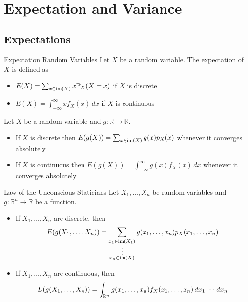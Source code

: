 \documentclass[a4paper]{article}
\begin{document}
\pagebreak
\section{Expectation and Variance}
\subsection{Expectations}
\begin{defn}{Expectation Random Variables}{} Let $X$ be a random variable. The expectation of $X$ is defined as 
\begin{itemize}
\item $E(X)=\sum_{x\in\operatorname{im}(X)}x\mathbb{P}_X(X=x)$ if $X$ is discrete
\item $E(X)=\int_{-\infty}^{\infty}xf_X(x)\,dx$ if $X$ is continuous
\end{itemize}
\end{defn}

\begin{prp}{}{} Let $X$ be a random variable and $g:\mathbb{R}\to\mathbb{R}$. 
\begin{itemize}
\item If $X$ is discrete then $E(g(X))=\sum_{x\in\operatorname{im}(X)}g(x)p_X(x)$ whenever it converges absolutely
\item If $X$ is continuous then $E(g(X))=\int_{-\infty}^{\infty}g(x)f_X(x)\,dx$ whenever it converges absolutely
\end{itemize}
\end{prp}

\begin{prp}{Law of the Unconscious Staticians}{} Let $X_1,\dots,X_n$ be random variables and $g:\mathbb{R}^n\to\mathbb{R}$ be a function. 
\begin{itemize}
\item If $X_1,\dots,X_n$ are discrete, then $$E(g(X_1,\dots,X_n))=\sum_{\substack{x_1\in\operatorname{im}(X_1)\\\vdots\\x_n\in\operatorname{im}(X)}}g(x_1,\dots,x_n)p_X(x_1,\dots,x_n)$$
\item If $X_1,\dots,X_n$ are continuous, then $$E(g(X_1,\dots,X_n))=\int_{\mathbb{R}^n}g(x_1,\dots,x_n)f_X(x_1,\dots,x_n)\,dx_1\cdots\,dx_n$$
\end{itemize}
\end{prp}
\end{document}
